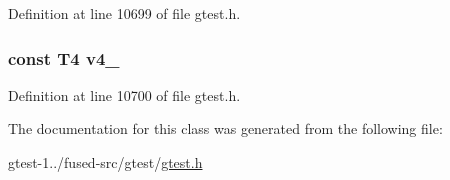 \-Definition at line 10699 of file gtest.\-h.

\hypertarget{classtesting_1_1internal_1_1ValueArray4_aac184059fee257381ccae81d8d112f85}{
\subsubsection[{v4\-\_\-}]{\setlength{\rightskip}{0pt plus 5cm}const \-T4 {\bf v4\-\_\-}}}\label{dc/dea/classtesting_1_1internal_1_1ValueArray4_aac184059fee257381ccae81d8d112f85}


\-Definition at line 10700 of file gtest.\-h.



\-The documentation for this class was generated from the following file\-:\begin{DoxyCompactItemize}
\item 
gtest-\/1../fused-\/src/gtest/\hyperlink{fused-src_2gtest_2gtest_8h}{gtest.\-h}\end{DoxyCompactItemize}
